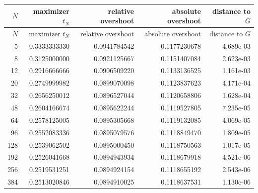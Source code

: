 \begin{longtable}{rrrrr}
\toprule
$N$ & maximizer $t_N$ & relative overshoot & absolute overshoot & distance to $G$\\
\midrule
\endfirsthead
\toprule
$N$ & maximizer $t_N$ & relative overshoot & absolute overshoot & distance to $G$\\
\midrule
\endhead
5 & 0.3333333330 & 0.0941784542 & 0.1177230678 & 4.689e-03\\
8 & 0.3125000000 & 0.0921125667 & 0.1151407084 & 2.623e-03\\
12 & 0.2916666666 & 0.0906509220 & 0.1133136525 & 1.161e-03\\
20 & 0.2749999982 & 0.0899070098 & 0.1123837623 & 4.171e-04\\
32 & 0.2656250012 & 0.0896527044 & 0.1120658806 & 1.628e-04\\
48 & 0.2604166674 & 0.0895622244 & 0.1119527805 & 7.235e-05\\
64 & 0.2578125005 & 0.0895305668 & 0.1119132085 & 4.069e-05\\
96 & 0.2552083336 & 0.0895079576 & 0.1118849470 & 1.809e-05\\
128 & 0.2539062502 & 0.0895000450 & 0.1118750563 & 1.017e-05\\
192 & 0.2526041668 & 0.0894943934 & 0.1118679918 & 4.521e-06\\
256 & 0.2519531251 & 0.0894924154 & 0.1118655192 & 2.543e-06\\
384 & 0.2513020846 & 0.0894910025 & 0.1118637531 & 1.130e-06\\
\bottomrule
\end{longtable}
